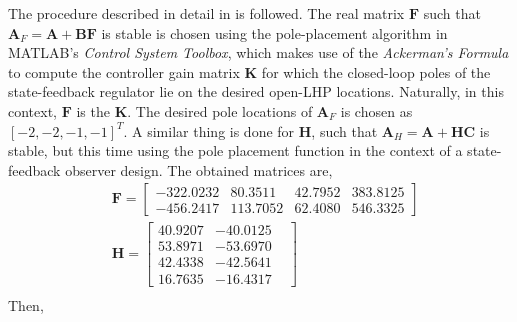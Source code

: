 The procedure described in detail in \cite{Bru87} is followed. The real matrix $\mathbf{F}$ such that $\mathbf{A}_F = \mathbf{A} + \mathbf{BF}$ is stable is chosen using the pole-placement algorithm in MATLAB's \emph{Control System Toolbox}, which makes use of the \emph{Ackerman's Formula} to compute the controller gain matrix $\mathbf{K}$ for which the closed-loop poles of the state-feedback regulator lie on the desired open-LHP locations. Naturally, in this context, $\mathbf{F}$ is the $\mathbf{K}$. The desired pole locations of $\mathbf{A}_F$ is chosen as $[-2,-2,-1,-1]^T$. A similar thing is done for $\mathbf{H}$, such that $\mathbf{A}_H = \mathbf{A} + \mathbf{HC}$ is stable, but this time using the pole placement function in the context of a state-feedback observer design. The obtained matrices are,
\begin{align*}
    &\bm{F} =
    \begin{bmatrix}
        -322.0232&80.3511&42.7952&383.8125\\
        -456.2417&113.7052&62.4080&546.3325
    \end{bmatrix}\\
    &\bm{H} =
    \begin{bmatrix}
        40.9207&-40.0125&\\
        53.8971&-53.6970\\
        42.4338&-42.5641\\
        16.7635&-16.4317
    \end{bmatrix}\\
\end{align*}
Then,
